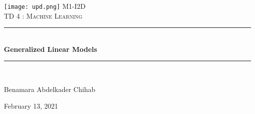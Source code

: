 \documentclass[12pt]{article}
\begin{document}
 

\begin{titlepage}
\lhead{\textcolor{primaryColor}{ML M1-IDD - 2020/2021}}

\newcommand{\HRule}{\rule{\linewidth}{0.5mm}} 

\center
 


\texttt{[image: upd.png]}
\center\textsc{\large M1-I2D}\\[0.5cm]
\vspace{2cm}
\textsc{\Large \textcolor{primaryColor}{TD 4 :} Machine Learning}\\[1.5cm] 



\HRule \\[0.4cm]
{ \huge \bfseries Generalized Linear Models}\\[0.4cm] 
\HRule \\[1.5cm]
 

\begin{minipage}{0.4\textwidth}
\begin{flushleft} \large
Benamara Abdelkader Chihab 
\end{flushleft}
\end{minipage}
\vspace{2cm}



{\large February 13, 2021}\\[2cm]



\vfill 

\end{titlepage}
\end{document}
